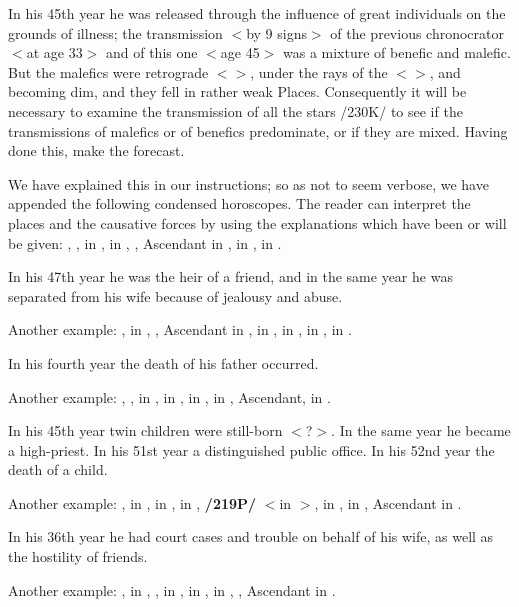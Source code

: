 In his 45th year he was released through the influence of great individuals on the grounds of illness; the transmission $<$by 9 signs$>$ of the previous chronocrator $<$at age 33$>$ and of this one $<$age 45$>$ was a mixture of benefic and malefic. But the malefics were retrograde $<$\Saturn$>$, under the rays of the \Sun\xspace $<$\Mars$>$, and becoming dim, and they fell in rather weak Places.
Consequently it will be necessary to examine the transmission of all the stars /230K/ to see if the transmissions of malefics or of benefics predominate, or if they are mixed. Having done this, make the forecast. 

We have explained this in our instructions; so as not to seem verbose, we have appended the following condensed horoscopes. The reader can interpret the places and the causative forces by using the
explanations which have been or will be given: \Sun, \Mercury, \Venus \xspace in \Libra, \Saturn\xspace in \Aquarius, \Jupiter, Ascendant in \Sagittarius, \Mars\xspace in \Virgo, \Moon in \Leo. 

In his 47th year he was the heir of a friend, and in the same year he was separated from his wife because of jealousy and abuse.

Another example: \Sun, \Mars\xspace in \Taurus, \Moon, Ascendant in \Aries, \Saturn\xspace in \Leo, \Jupiter\xspace in \Cancer, \Venus\xspace in \Pisces, \Mercury\xspace in \Gemini. 

In his fourth year the death of his father occurred.

Another example: \Sun, \Mercury, \Saturn\xspace in \Sagittarius, \Moon in \Pisces, \Mars\xspace in \Leo, \Venus\xspace in \Capricorn, Ascendant, \Jupiter\xspace in \Taurus. 

In his 45th year twin children were still-born $<$?$>$. In the same
year he became a high-priest. In his 51st year a distinguished public office. In his 52nd year the death of a child. 

Another example: \Sun, \Venus\xspace in \Taurus, \Moon\xspace in \Aries, \Saturn\xspace in \Cancer, \textbf{/219P/} \Jupiter $<$in \Libra$>$, \Mars\xspace in \Virgo, \Mercury\xspace in \Gemini, Ascendant in \Sagittarius. 

In his 36th year he had court cases and trouble on behalf of his wife, as well as the hostility of friends.

Another example: \Sun, \Venus\xspace in \Aquarius, \Moon, \Jupiter\xspace in \Sagittarius, \Saturn\xspace in \Leo, \Mercury\xspace in \Capricorn, \Mars, Ascendant in \Libra. 


